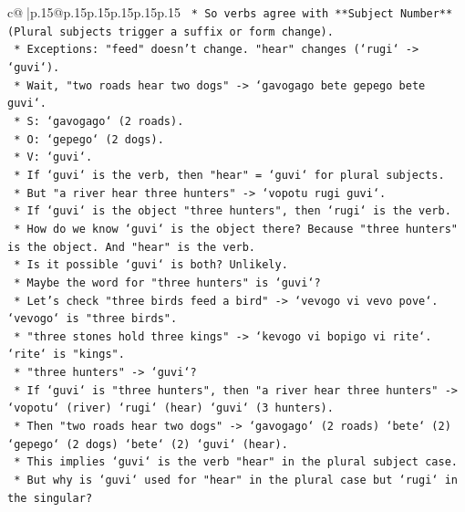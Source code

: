 \documentclass{article}
\begin{document}
{\begin{supertabular}{c@{$\;$}|p{.15\linewidth}@{}p{.15\linewidth}p{.15\linewidth}p{.15\linewidth}p{.15\linewidth}p{.15\linewidth}}
{{{\texttt{                *   So verbs agree with **Subject Number** (Plural subjects trigger a suffix or form change).} \\
\texttt{                *   Exceptions: "feed" doesn't change. "hear" changes (`rugi` {-}> `guvi`).} \\
\texttt{                *   Wait, "two roads hear two dogs" {-}> `gavogago bete gepego bete guvi`.} \\
\texttt{                    *   S: `gavogago` (2 roads).} \\
\texttt{                    *   O: `gepego` (2 dogs).} \\
\texttt{                    *   V: `guvi`.} \\
\texttt{                    *   If `guvi` is the verb, then "hear" = `guvi` for plural subjects.} \\
\texttt{                    *   But "a river hear three hunters" {-}> `vopotu rugi guvi`.} \\
\texttt{                    *   If `guvi` is the object "three hunters", then `rugi` is the verb.} \\
\texttt{                    *   How do we know `guvi` is the object there? Because "three hunters" is the object. And "hear" is the verb.} \\
\texttt{                    *   Is it possible `guvi` is both? Unlikely.} \\
\texttt{                    *   Maybe the word for "three hunters" is `guvi`?} \\
\texttt{                    *   Let's check "three birds feed a bird" {-}> `vevogo vi vevo pove`. `vevogo` is "three birds".} \\
\texttt{                    *   "three stones hold three kings" {-}> `kevogo vi bopigo vi rite`. `rite` is "kings".} \\
\texttt{                    *   "three hunters" {-}> `guvi`?} \\
\texttt{                    *   If `guvi` is "three hunters", then "a river hear three hunters" {-}> `vopotu` (river) `rugi` (hear) `guvi` (3 hunters).} \\
\texttt{                    *   Then "two roads hear two dogs" {-}> `gavogago` (2 roads) `bete` (2) `gepego` (2 dogs) `bete` (2) `guvi` (hear).} \\
\texttt{                    *   This implies `guvi` is the verb "hear" in the plural subject case.} \\
\texttt{                    *   But why is `guvi` used for "hear" in the plural case but `rugi` in the singular?} \\
}}}
\end{supertabular}}
\end{document}
